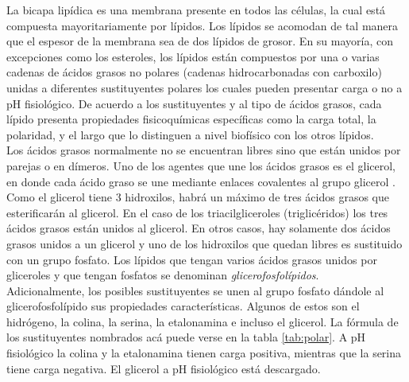 La bicapa lip\'{i}dica es una membrana presente en todos las c\'{e}lulas, la cual est\'{a} compuesta mayoritariamente por l\'{i}pidos. Los l\'{i}pidos se acomodan de tal manera que el espesor de la membrana sea de dos l\'{i}pidos de grosor.  En su mayor\'{i}a, con excepciones como los esteroles, los l\'{i}pidos est\'{a}n compuestos por una o varias cadenas de \'{a}cidos grasos no polares (cadenas hidrocarbonadas con carboxilo) unidas a diferentes sustituyentes polares los cuales pueden presentar carga o no a pH fisiol\'{o}gico. De acuerdo a los sustituyentes y al tipo de \'{a}cidos grasos, cada l\'{i}pido presenta propiedades fisicoqu\'{i}micas espec\'{i}ficas como la carga total, la polaridad, y el largo que lo distinguen a nivel biof\'{i}sico con los otros l\'{i}pidos.\\

Los \'{a}cidos grasos normalmente no se encuentran libres sino que est\'{a}n unidos por parejas o en d\'{i}meros. Uno de los agentes que une los \'{a}cidos grasos es el glicerol, en donde cada \'{a}cido graso se une mediante enlaces covalentes al grupo glicerol \cite{Bagatolli2017VidaGrasas}. Como el glicerol tiene 3 hidroxilos, habr\'{a} un m\'{a}ximo de tres \'{a}cidos grasos que esterificar\'{a}n al glicerol. En el caso de los triacilgliceroles (triglic\'{e}ridos) los tres \'{a}cidos grasos est\'{a}n unidos al glicerol. En otros casos, hay solamente dos \'{a}cidos grasos unidos a un glicerol y uno de los hidroxilos que quedan libres es sustituido con un grupo fosfato. Los l\'{i}pidos que tengan varios \'{a}cidos grasos unidos por gliceroles y que tengan fosfatos se denominan \textit{glicerofosfol\'{i}pidos}.\\

Adicionalmente, los posibles sustituyentes se unen al grupo fosfato d\'{a}ndole al glicerofosfol\'{i}pido sus propiedades caracter\'{i}sticas. Algunos de estos son el hidr\'{o}geno, la colina, la serina, la etalonamina e incluso el glicerol. La f\'{o}rmula de los sustituyentes nombrados ac\'{a} puede verse en la tabla \ref{tab:polar}. A pH fisiol\'{o}gico la colina y la etalonamina tienen carga positiva, mientras que la serina tiene carga negativa. El glicerol a pH fisiol\'{o}gico est\'{a} descargado.\\

